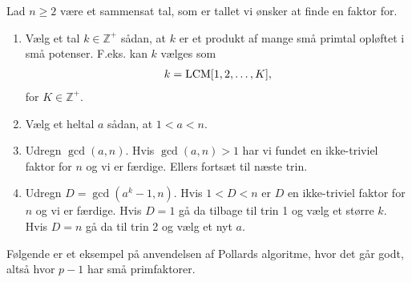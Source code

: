 \begin{algorithm}
Lad $n \geq 2$ være et sammensat tal, som er tallet vi ønsker at 
finde en faktor for.
\begin{enumerate}
	\item Vælg et tal $k \in \mathbb{Z}^+$ sådan, at $k$ er et produkt
	af mange små primtal opløftet i små potenser. F.eks. kan $k$ vælges
	som
	\begin{align*}
		k = \mathrm{LCM} [1, 2, \ldots, K],
	\end{align*}
	for $K \in \mathbb{Z}^+$.
	\item Vælg et heltal $a$ sådan, at $1 < a <n$.
	\item Udregn $\gcd(a, n)$. Hvis $\gcd(a, n) > 1$ har vi fundet en
	ikke-triviel faktor for $n$ og vi er færdige. Ellers fortsæt til næste
	trin.
	\item Udregn $D = \gcd(a^k - 1, n)$. Hvis $1 < D < n$ er $D$ en ikke-triviel
	faktor for $n$ og vi er færdige. Hvis $D = 1$ gå da tilbage til trin 1
	og vælg et større $k$. Hvis $D = n$ gå da til trin 2 og vælg et nyt $a$. 
\end{enumerate}


\end{algorithm}



Følgende er et eksempel på anvendelsen af Pollards algoritme,
hvor det går godt, altså hvor $p-1$ har små primfaktorer.

